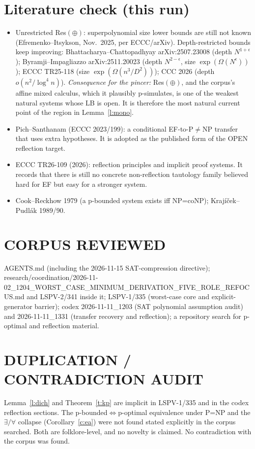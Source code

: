 \documentclass[11pt]{article}
\theoremstyle{definition}
\begin{document}
\section{Literature check (this run)}
\begin{itemize}
\item Unrestricted Res$(\oplus)$: superpolynomial size lower bounds are still
not known (Efremenko--Itsykson, Nov.\ 2025, per ECCC/arXiv). Depth-restricted
bounds keep improving: Bhattacharya--Chattopadhyay arXiv:2507.23008 (depth
$N^{1+\epsilon}$); Byramji--Impagliazzo arXiv:2511.20023 (depth $N^{2-\epsilon}$,
size $\exp(\Omega(N^\epsilon))$); ECCC TR25-118 (size $\exp(\Omega(n^3/D^2))$);
CCC 2026 (depth $o(n^2/\log^4 n)$).
\emph{Consequence for the pincer:} Res$(\oplus)$, and the corpus's affine mixed
calculus, which it plausibly p-simulates, is one of the weakest natural systems
whose LB is open. It is therefore the most natural current point of the region
in Lemma~\ref{l:mono}.
\item Pich--Santhanam (ECCC 2023/199): a conditional EF-to-P$\ne$NP transfer that
uses extra hypotheses. It is adopted as the published form of the OPEN reflection target.
\item ECCC TR26-109 (2026): reflection principles and implicit proof systems. It
records that there is still no concrete non-reflection tautology family believed
hard for EF but easy for a stronger system.
\item Cook--Reckhow 1979 (a p-bounded system exists iff NP=coNP); Krajíček--Pudlák 1989/90.
\end{itemize}

\section*{CORPUS REVIEWED}
AGENTS.md (including the 2026-11-15 SAT-compression directive);
research/coordination/2026-11-02\_1204\_WORST\_CASE\_MINIMUM\_DERIVATION\_FIVE\_ROLE\_REFOCUS.md
and LSPV-2/341 inside it; LSPV-1/335 (worst-case core and explicit-generator barrier);
codex 2026-11-11\_1203 (SAT polynomial assumption audit) and 2026-11-11\_1331
(transfer recovery and reflection); a repository search for p-optimal and reflection material.

\section*{DUPLICATION / CONTRADICTION AUDIT}
Lemma~\ref{l:dich} and Theorem~\ref{t:kp} are implicit in LSPV-1/335 and in the
codex reflection sections. The p-bounded$\iff$p-optimal equivalence under P=NP and
the $\exists/\forall$ collapse (Corollary~\ref{c:ea}) were not found stated
explicitly in the corpus searched. Both are folklore-level, and no novelty is
claimed. No contradiction with the corpus was found.
\end{document}

